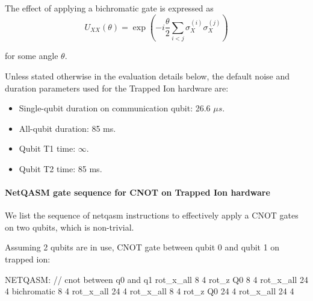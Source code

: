 The effect of applying a bichromatic gate is expressed as
\[
   U_{XX}(\theta) = \exp(-i \frac{\theta}{2} \sum_{i<j} \sigma_X^{(i)} \sigma_X^{(j)})
\]

for some angle $\theta$.

Unless stated otherwise in the evaluation details below, the default noise and duration parameters used for the Trapped Ion hardware are:
\begin{itemize}
  \item Single-qubit duration on communication qubit: 26.6 $\mu s$.
  \item All-qubit duration: 85 ms.
  \item Qubit T1 time: $\infty$.
  \item Qubit T2 time: 85 ms.
\end{itemize}

\paragraph{NetQASM gate sequence for CNOT on Trapped Ion hardware}
We list the sequence of netqasm instructions to effectively apply a CNOT gates on two qubits, which is non-trivial.

Assuming 2 qubits are in use, CNOT gate between qubit 0 and qubit 1 on trapped ion:
\begin{qoalacode}
  NETQASM:
    // cnot between q0 and q1
    rot_x_all 8 4
    rot_z Q0 8 4
    rot_x_all 24 4
    bichromatic 8 4
    rot_x_all 24 4
    rot_x_all 8 4
    rot_z Q0 24 4
    rot_x_all 24 4
\end{qoalacode}

